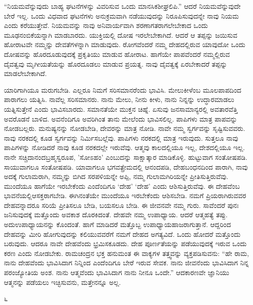 “ನಿಯಮವೆನ್ನುವುದು ಬಾಹ್ಯ ಘಟನೆಗಳನ್ನು ವಿವರಿಸುವ ಒಂದು ಮಾನಸಿಕ\break ಶೀಘ್ರಲಿಪಿ.” ಆದರೆ ನಿಯಮವೆನ್ನುವುದೇ ಬೇರೆ ಇಲ್ಲ. ಒಂದು ವಿಧವಾದ ಘಟನೆಗಳು ಅನುಕ್ರಮವಾಗಿ ನಡೆಯುವುದನ್ನು ನಿರೂಪಿಸುವುದನ್ನೇ ನಾವು ನಿಯಮ ಎಂದು ಕರೆಯುತ್ತೇವೆ. ನಿಯಮವನ್ನು ನಾವು ಅನಿವಾರ್ಯವಾಗಿ ಶರಣಾಗತರಾಗಲೇಬೇಕಾದ ಒಂದು ಮೂಢನಂಬಿಕೆಯನ್ನಾಗಿ ಮಾಡಬಾರದು. ಯುಕ್ತಿಯಲ್ಲಿ ದೋಷ ಇರಲೇಬೇಕಾಗಿದೆ. ಆದರೆ ಆ ತಪ್ಪನ್ನು ಜಯಿಸುವ ಹೋರಾಟವೇ ನಮ್ಮನ್ನು ದೇವತೆಗಳನ್ನಾಗಿ ಮಾಡುವುದು. ರೋಗವೆಂದರೆ ನಮ್ಮ ದೇಹದಲ್ಲಿರುವ ಯಾವುದೋ ಒಂದು ದೋಷವನ್ನು ಹೊರದೂಡುವುದಕ್ಕೆ ಪ್ರಕೃತಿಯು ಮಾಡುವ ಹೋರಾಟ. ಹಾಗೆಯೇ ಪಾಪವೆಂದರೆ ನಮ್ಮಲ್ಲಿರುವ ದೈವತ್ವವು ಮೃಗೀಯತೆಯನ್ನು ಹೊರದೂಡಲು ಮಾಡುವ ಪ್ರಯತ್ನ. ನಾವು ದೈವತ್ವಕ್ಕೆ ಏರಬೇಕಾದರೆ ತಪ್ಪನ್ನು ಮಾಡಲೇಬೇಕಾಗಿದೆ.

ಯಾರಿಗಾಗಿಯೂ ಮರುಗಬೇಡಿ. ಎಲ್ಲರೂ ನಿಮಗೆ ಸರಿಸಮಾನರೆಂದು ಭಾವಿಸಿ. ಮೇಲುಕೀಳೆಂಬ ಮೂಲಪಾಪದಿಂದ ಪಾರಾಗಲು ಯತ್ನಿಸಿ. ನಾವೆಲ್ಲ ಸರಿಸಮಾನರು. ನಾನು ಮೇಲು, ನೀನು ಕೀಳು, ನಾನು ನಿನ್ನನ್ನು ಉದ್ಧಾರಮಾಡಲು ಯತ್ನಿಸುತ್ತೇನೆ ಎಂದು ಭಾವಿಸಬಾರದು. ಸಮಾನತೆಯೇ ಮುಕ್ತನ ಚಿಹ್ನೆ. ಏಸುವು ಜನಸಾಮಾನ್ಯರಲ್ಲಿ ಅವತಾರವೆತ್ತಿ ಅವರೊಡನೆ ಬಾಳಿದ. ಅವನೆಂದಿಗೂ ಅವರಿಗಿಂತ ತಾನು ಮೇಲೆಂದು ಭಾವಿಸಲಿಲ್ಲ. ಪಾಪಿಗಳು ಮಾತ್ರ ಪಾಪವನ್ನು ನೋಡಬಲ್ಲರು. ಮನುಷ್ಯನನ್ನು ನೋಡಬೇಡಿ, ದೇವರನ್ನು ಮಾತ್ರ ನೋಡಿ. ನಾವೇ ನಮ್ಮ ಸ್ವರ್ಗವನ್ನು ಸೃಷ್ಟಿಸುವವರು. ನಾವು ನರಕದಲ್ಲಿ ಕೂಡ ಸ್ವರ್ಗವನ್ನು ನಿರ್ಮಿಸಬಲ್ಲೆವು. ಪಾಪಿಗಳು ನರಕದಲ್ಲಿ ಮಾತ್ರ ಇರುವುದು. ಸುತ್ತಲೂ ನಾವು ಪಾಪಿಗಳನ್ನು ನೋಡಿದರೆ ನಾವು ಕೂಡ ನರಕದಲ್ಲೇ ಇರುವೆವು. ಆತ್ಮವು ಕಾಲದಲ್ಲಿಯೂ ಇಲ್ಲ, ದೇಶದಲ್ಲಿಯೂ ಇಲ್ಲ. ನಾನೇ ಸಚ್ಚಿದಾನಂದಬ್ರಹ್ಮಸ್ವರೂಪ, 'ಸೋಽಹಂ' ಎಂಬುದನ್ನು ಸಾಕ್ಷಾತ್ಕಾರ ಮಾಡಿಕೊಳ್ಳಿ. ಹುಟ್ಟುವಾಗ ಸಂತೋಷಪಡಿ. ಸಾಯುವಾಗಲೂ ಸಂತೋಷಪಡಿ. ಯಾವಾಗಲೂ ಭಗವತ್ಪ್ರೇಮದಲ್ಲಿ ಆನಂದಪಡಿ, ದೇಹಬಂಧನದಿಂದ ಪಾರಾಗಿ, ನಾವು ಅದಕ್ಕೆ ಗುಲಾಮರಾಗಿ, ನಮ್ಮನ್ನು ಬಿಗಿದ ಸರಪಳಿಯನ್ನೇ ಅಪ್ಪಿ, ನಮ್ಮ ಗುಲಾಮಗಿರಿಯನ್ನೇ ಪ್ರೀತಿಸುತ್ತಿರುವೆವು. ಮುಂದೆಯೂ ಹಾಗೆಯೇ ಇರಬೇಕೆಂದು ಎಂದೆಂದಿಗೂ `ದೇಹ' `ದೇಹ' ಎಂದು ಆಶಿಸುತ್ತಿರುವೆವು. ಈ ದೇಹವೆಂಬ ಭಾವನೆಯಲ್ಲಿ\break ಆಸಕ್ತರಾಗಬೇಡಿ. ಈಗಿನಂತೆಯೇ ಮುಂದೆಯೂ ಇರಬೇಕೆಂದು ಆಶಿಸಬೇಡಿ. ನಮಗೆ ಪ್ರಿಯರಾಗಿರುವವರ ದೇಹವನ್ನಾದರೂ ಸರಿಯೆ ಪ್ರೀತಿಸಲೂ ಬೇಡಿ, ಬಯಸಲೂ ಬೇಡಿ. ಈ ಜೀವನವೇ ನಮ್ಮ ಗುರು. ಸಾವೆಂದರೆ ಪುನಃ ಜನಿಸುವುದಕ್ಕೆ ಮತ್ತೊಂದು ಅವಕಾಶ ದೊರಕಿದಂತೆ. ದೇಹವೇ ನಮ್ಮ ಉಪಾಧ್ಯಾಯ. ಆದರೆ ಆತ್ಮಹತ್ಯೆ ತಪ್ಪು. ಅದು\break ಉಪಾಧ್ಯಾಯನನ್ನು ಕೊಂದಂತೆ. ಹಾಗೆ ಮಾಡಿದರೆ ಮತ್ತೊಬ್ಬ ಉಪಾಧ್ಯಾಯ\break ಹಾಜರಾಗುತ್ತಾನೆ. ಆದ್ದರಿಂದ ದೇಹವನ್ನು ಮೀರಿ ಹೋಗುವುದನ್ನು ಕಲಿಯುವವರೆಗೆ ನಮಗೆ ದೇಹದ ಅಗತ್ಯವಿದೆ. ಒಂದು ಹೋದರೆ ಮತ್ತೊಂದು ಬರುವುದು. ಆದರೂ ನಾವೇ ದೇಹವೆಂದು ಭ್ರಮಿಸಕೂಡದು. ದೇಹ ಪೂರ್ಣತೆಯನ್ನು ಪಡೆಯುವುದಕ್ಕೆ ಇರುವ ಒಂದು ಕರಣ ಎಂದು ನೋಡಬೇಕು. ರಾಮಚಂದ್ರನ ಭಕ್ತ ಹನುಮಂತ ಈ ವಾಕ್ಯಗಳ ತತ್ತ್ವವನ್ನು ವ್ಯಕ್ತಪಡಿಸುವನು: “ಹೇ ರಾಮ, ನಾನು ದೇಹವೆಂದು ಭಾವಿಸಿದಾಗ ನಿನ್ನಿಂದ ಎಂದೆಂದಿಗೂ ಬೇರೆ ಇರುವ ಸೇವಕ. ನಾನು ಜೀವನೆಂದು ಭಾವಿಸಿದಾಗ ನಿನ್ನ ಪರಂಜ್ಯೋತಿಯ ಅಂಶ. ನಾನು ಆತ್ಮವೆಂದು ಭಾವಿಸಿದಾಗ ನಾನು ನೀನೂ ಒಂದೇ.'' ಆದಕಾರಣವೇ ಜ್ಞಾನಿಯು ಆತ್ಮನನ್ನು ಪಡೆಯಲು ಇಚ್ಛಿಸುವನು, ಮತ್ತೇನನ್ನೂ ಅಲ್ಲ.

\begin{center}
೬
\end{center}

